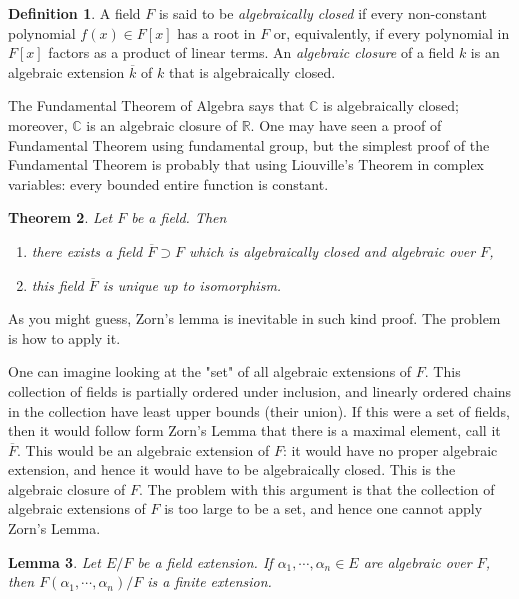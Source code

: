 \documentclass[12pt]{report}
\newtheorem{thm}{Theorem}[section]
\newtheorem{lemma}[thm]{Lemma}
\theoremstyle{definition}
\newtheorem{defn}[thm]{Definition}
\def\CC{\mathbb{C}}
\def\RR{\mathbb{R}}
\def\aa{\alpha}
\begin{document}
\begin{defn}
    A field $F$ is said to be \emph{algebraically closed} if every non-constant polynomial $f(x) \in F[x]$ has a root in $F$ or, equivalently, if every polynomial in $F[x]$ factors as a product of linear terms. An \emph{algebraic closure} of a field $k$ is an algebraic extension $\overline{k}$ of $k$ that is algebraically closed.
\end{defn}

The Fundamental Theorem of Algebra says that $\CC$ is algebraically closed; moreover, $\CC$ is an algebraic closure of $\RR$. One may have seen a proof of Fundamental Theorem using fundamental group, but the simplest proof of the Fundamental Theorem is probably that using Liouville's Theorem in complex variables: every bounded entire function is constant.

\begin{thm}\label{ac}
    Let $F$ be a field. Then \begin{enumerate}
        \item there exists a field $\overline{F}\supset F$ which is algebraically closed and algebraic over $F$,
        \item this field $\overline{F}$ is unique up to isomorphism.
    \end{enumerate}
\end{thm}

As you might guess, Zorn's lemma is inevitable in such kind proof. The problem is how to apply it.

One can imagine looking at the "set" of all algebraic extensions of $F$. This collection of fields is partially ordered under inclusion, and linearly ordered chains in the collection have least upper bounds (their union). If this were a set of fields, then it would follow form Zorn's Lemma that there is a maximal element, call it $\overline{F}$. This would be an algebraic extension of $F$: it would have no proper algebraic extension, and hence it would have to be algebraically closed. This is the algebraic closure of $F$. The problem with this argument is that the collection of algebraic extensions of $F$ is too large to be a set, and hence one cannot apply Zorn's Lemma.

\begin{lemma}\label{ac4}
    Let $E/F$ be a field extension. If $\aa_1,\cdots,\aa_n \in E$ are algebraic over $F$, then $F(\aa_1,\cdots,\aa_n)/F$  is a finite extension.
\end{lemma}
\end{document}
